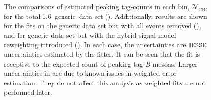 \begin{figure}[htbp!]
    \caption{\label{fig:mc_fit_yield_comparisons}The comparisons of estimated peaking tag-\B counts in each \EB bin, $\mathcal{N}_{\mathrm{CB}}$,
    for the total 1.6~\invab generic~\MC data set ().
    Additionally, results are shown for the fits on the generic \MC data set but with all \BtoXsgamma events removed (),
    and for generic \MC data set but with the hybrid-signal model reweighting introduced ().
    In each case, the uncertainties are $\texttt{HESSE}$ uncertainties estimated by the fitter.
    It can be seen that the fit is receptive to the expected count of peaking tag-$B$ mesons.
    Larger uncertainties in  are due to known issues in weighted error estimation.
    They do not affect this analysis as weighted fits are not performed later.
    }
\end{figure}
